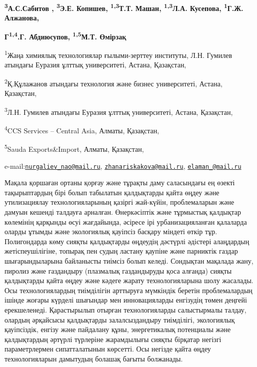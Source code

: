 {\bfseries \textsuperscript{3}А.С.Сабитов , \textsuperscript{3}Э.Е.
Копишев, \textsuperscript{1,3}Т.Т. Машан, \textsuperscript{1,3}Л.А.
Кусепова, \textsuperscript{1}Г.Ж. Алжанова,}

{\bfseries Г\textsuperscript{1,4}.Г. Абдиюсупов, \textsuperscript{1,5}М.Т.
Өмірзақ}

\textsuperscript{1}Жаңа химиялық технологиялар ғылыми-зерттеу институты,
Л.Н. Гумилев атындағы Еуразия ұлттық университеті, Астана, Қазақстан,

\textsuperscript{2}Қ.Құлажанов атындағы технология және бизнес
университеті, Астана, Қазақстан,

\textsuperscript{3}Л.Н. Гумилев атындағы Еуразия ұлттық университеті,
Астана, Қазақстан,

\textsuperscript{4}CCS Services -- Central Asia, Алматы, Қазақстан,

\textsuperscript{5}Sauda Exports\&Import, Алматы, Қазақстан,

e-mail:\href{mailto:nurgaliev_nao@mail.ru}{\nolinkurl{nurgaliev\_nao@mail.ru}},
\href{mailto:zhanariskakova@mail.ru}{\nolinkurl{zhanariskakova@mail.ru}},
\href{mailto:elaman_@mail.ru}{\nolinkurl{elaman\_@mail.ru}}

Мақала қоршаған ортаны қорғау және тұрақты даму саласындағы ең өзекті
тақырыптардың бірі болып табылатын қалдықтарды қайта өңдеу және
утилизациялау технологияларының қазіргі жай-күйін, проблемаларын және
дамуын кешенді талдауға арналған. Өнеркәсіптік және тұрмыстық қалдықтар
көлемінің қарқынды өсуі жағдайында, әсіресе ірі урбанизацияланған
қалаларда оларды ұтымды және экологиялық қауіпсіз басқару міндеті өткір
тұр. Полигондарда көму сияқты қалдықтарды өңдеудің дәстүрлі әдістері
алаңдардың жетіспеушілігіне, топырақ пен судың ластану қаупіне және
парниктік газдар шығарындыларына байланысты тиімсіз болып келеді.
Сондықтан мақалада жану, пиролиз және газдандыру (плазмалық газдандыруды
қоса алғанда) сияқты қалдықтарды қайта өңдеу және кәдеге жарату
технологияларына шолу жасалады. Осы технологиялардың тиімділігін
арттыруға мүмкіндік беретін проблемалардың ішінде жоғары күрделі
шығындар мен инновацияларды енгізудің төмен деңгейі ерекшеленеді.
Қарастырылып отырған технологияларды салыстырмалы талдау, олардың
әрқайсысы қалдықтарды залалсыздандыру тиімділігі, экологиялық
қауіпсіздік, енгізу және пайдалану құны, энергетикалық потенциалы және
қалдықтардың әртүрлі түрлеріне жарамдылығы сияқты бірқатар негізгі
параметрлермен сипатталатынын көрсетті. Осы негізде қайта өңдеу
технологияларын дамытудың болашақ бағыты болжанады.

